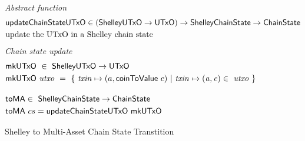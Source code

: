 \begin{figure}[htb]
  \emph{Abstract function}
  \begin{align*}
      & \mathsf{updateChainStateUTxO} \in (\mathsf{ShelleyUTxO} \to \mathsf{UTxO}) \to \mathsf{ShelleyChainState} \to \mathsf{ChainState} \\
      & \text{update the UTxO in a Shelley chain state}
  \end{align*}
  \emph{Chain state update}
  \begin{align*}
      & \fun{mkUTxO} ~\in~ \ShelleyUTxO  \to \UTxO  \\
      & \fun{mkUTxO}~\var{utxo} ~=~ \{~ \var{txin} \mapsto (a,\fun{coinToValue}~c) ~\vert~
      \var{txin} \mapsto \var{(a,c)}\in ~\var{utxo}~\}
      \nextdef
      & \fun{toMA} \in ~ \ShelleyChainState \to \ChainState \\
      & \fun{toMA}~cs = \fun{updateChainStateUTxO}~\fun{mkUTxO}
  \end{align*}
  \caption{Shelley to Multi-Asset Chain State Transtition}
  \label{fig:functions:to-ma}
\end{figure}

